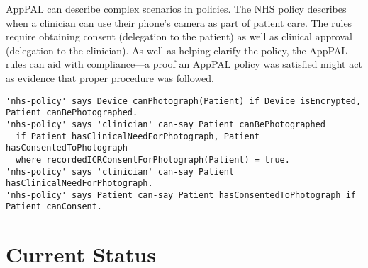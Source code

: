 \documentclass{easychair}
\newcommand{\dotdotdot}[1]{$[\cdots]$}
\begin{document}
AppPAL can describe complex scenarios in policies.
The NHS policy describes when a clinician can use their phone's camera as part of patient care.
The rules require obtaining consent (delegation to the patient) as well as clinical approval (delegation to the clinician). 
As well as helping clarify the policy, the AppPAL rules can aid with compliance---a proof an AppPAL policy was satisfied might act as evidence that proper procedure was followed.
\begin{lstlisting}[title={\footnotesize\textbf{NHS}:~\itshape ``%
Some mobile devices have the ability to take photographs / videos. 
This function should not be used for photographs / videos of an individual’s care and treatment unless the device has encryption enabled and it is clinically appropriate to do so.
If the photography / video facility is used as part of the recording of an individual’s care and treatment, the device user must ensure that the consent of the individual has been collected prior to taking any photograph / video. 
\dotdotdot{The individual needs to fully understand why the photograph / video is being taken and the member of staff plans to do with it, in particular if it will be shared. }
A record of the consent must be entered into the individual’s care record. 
''}]
'nhs-policy' says Device canPhotograph(Patient) if Device isEncrypted, Patient canBePhotographed.
'nhs-policy' says 'clinician' can-say Patient canBePhotographed
  if Patient hasClinicalNeedForPhotograph, Patient hasConsentedToPhotograph
  where recordedICRConsentForPhotograph(Patient) = true.
'nhs-policy' says 'clinician' can-say Patient hasClinicalNeedForPhotograph.
'nhs-policy' says Patient can-say Patient hasConsentedToPhotograph if Patient canConsent.
\end{lstlisting}

\section{Current Status}
\end{document}

